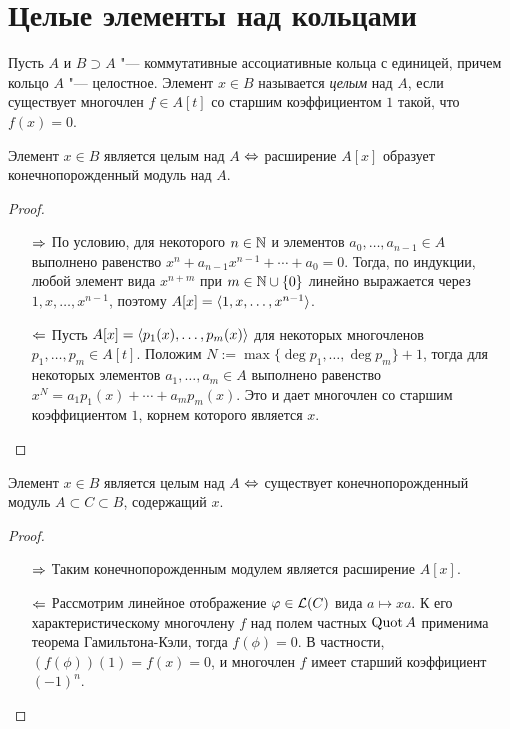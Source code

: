 \section{Целые элементы над кольцами}

\begin{definition}
	Пусть $A$ и $B \supset A$ "--- коммутативные ассоциативные кольца с единицей, причем кольцо $A$ "--- целостное. Элемент $x \in B$ называется \textit{целым} над $A$, если существует многочлен $f \in A[t]$ со старшим коэффициентом $1$ такой, что $f(x) = 0$.
\end{definition}

\begin{theorem}
	Элемент $x \in B$ является целым над $A$ $\Leftrightarrow$ расширение $A[x]$ образует конечнопорожденный модуль над $A$.
\end{theorem}

\begin{proof}~
	\begin{enumerate}
		\item[$\Rightarrow$] По условию, для некоторого $n \in \mathbb{N}$ и элементов $a_0, \dotsc, a_{n - 1} \in A$ выполнено равенство $x^n + a_{n-1}x^{n-1} + \dotsb + a_0 = 0$. Тогда, по индукции, любой элемент вида $x^{n + m}$ при $m \in \mathbb{N} \cup \{0\}$ линейно выражается через $1, x, \dotsc, x^{n- 1}$, поэтому $A[x] = \langle1, x, \dotsc, x^{n- 1}\rangle$.
		
		\item[$\Leftarrow$] Пусть $A[x] = \langle p_1(x), \dotsc, p_m(x)\rangle$ для некоторых многочленов $p_1, \dotsc, p_m \in A[t]$. Положим $N := \max\{\deg p_1, \dotsc, \deg p_m\} + 1$, тогда для некоторых элементов $a_1, \dotsc, a_m \in A$ выполнено равенство $x^N = a_1p_1(x) + \dotsb + a_mp_m(x)$. Это и дает многочлен со старшим коэффициентом $1$, корнем которого является $x$. \qedhere
	\end{enumerate}
\end{proof}

\begin{corollary}
	Элемент $x \in B$ является целым над $A$ $\Leftrightarrow$ существует конечнопорожденный модуль $A \subset C \subset B$, содержащий $x$.
\end{corollary}

\begin{proof}~
	\begin{itemize}
		\item[$\Rightarrow$] Таким конечнопорожденным модулем является расширение $A[x]$.
		\item[$\Leftarrow$] Рассмотрим линейное отображение $\varphi \in \mathcal L(C)$ вида $a \mapsto xa$. К его характеристическому многочлену $f$ над полем частных $\operatorname{Quot}{A}$ применима теорема Гамильтона-Кэли, тогда $f(\phi) = 0$. В частности, $(f(\phi))(1) = f(x) = 0$, и многочлен $f$ имеет старший коэффициент $(-1)^n$.\qedhere
	\end{itemize}
\end{proof}

